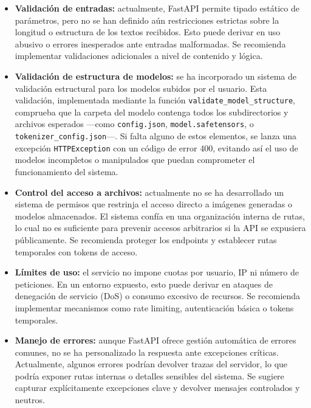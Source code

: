 \begin{itemize}
    \item \textbf{Validación de entradas:} actualmente, FastAPI permite tipado estático de parámetros, pero no se han definido aún restricciones estrictas sobre la longitud o estructura de los textos recibidos. Esto puede derivar en uso abusivo o errores inesperados ante entradas malformadas. Se recomienda implementar validaciones adicionales a nivel de contenido y lógica.
    
    \item \textbf{Validación de estructura de modelos:} se ha incorporado un sistema de validación estructural para los modelos subidos por el usuario. Esta validación, implementada mediante la función \texttt{validate\_model\_structure}, comprueba que la carpeta del modelo contenga todos los subdirectorios y archivos esperados —como \texttt{config.json}, \texttt{model.safetensors}, o \texttt{tokenizer\_config.json}—. Si falta alguno de estos elementos, se lanza una excepción \texttt{HTTPException} con un código de error 400, evitando así el uso de modelos incompletos o manipulados que puedan comprometer el funcionamiento del sistema.

    \item \textbf{Control del acceso a archivos:} actualmente no se ha desarrollado un sistema de permisos que restrinja el acceso directo a imágenes generadas o modelos almacenados. El sistema confía en una organización interna de rutas, lo cual no es suficiente para prevenir accesos arbitrarios si la API se expusiera públicamente. Se recomienda proteger los endpoints y establecer rutas temporales con tokens de acceso.

    \item \textbf{Límites de uso:} el servicio no impone cuotas por usuario, IP ni número de peticiones. En un entorno expuesto, esto puede derivar en ataques de denegación de servicio (DoS) o consumo excesivo de recursos. Se recomienda implementar mecanismos como rate limiting, autenticación básica o tokens temporales.

    \item \textbf{Manejo de errores:} aunque FastAPI ofrece gestión automática de errores comunes, no se ha personalizado la respuesta ante excepciones críticas. Actualmente, algunos errores podrían devolver trazas del servidor, lo que podría exponer rutas internas o detalles sensibles del sistema. Se sugiere capturar explícitamente excepciones clave y devolver mensajes controlados y neutros.
\end{itemize}

